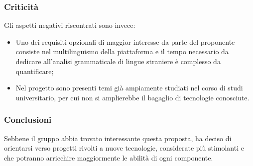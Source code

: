 \subsubsection{Criticità}
Gli aspetti negativi riscontrati sono invece:
\begin{itemize}
	\item Uno dei requisiti opzionali di maggior interesse da parte del
	 proponente consiste nel multilinguismo della piattaforma e il tempo
	 necessario da dedicare all'analisi grammaticale di lingue straniere è
	 complesso da quantificare;
	
	\item Nel progetto sono presenti temi già ampiamente studiati nel corso di
	 studi universitario, per cui non si amplierebbe il bagaglio di
	 tecnologie conosciute.
 	
\end{itemize}
\subsubsection{Conclusioni}
Sebbene il gruppo abbia trovato interessante questa proposta, ha deciso
di orientarsi verso progetti rivolti a nuove tecnologie, considerate più
stimolanti e che potranno arricchire maggiormente le abilità di ogni 
componente. 


